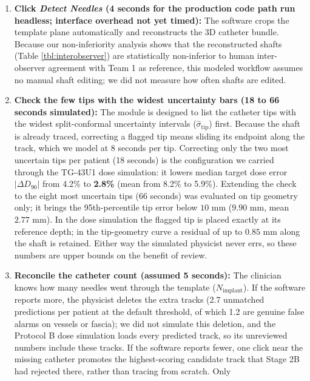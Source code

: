 \documentclass[
  11pt,
]{article}
\providecommand{\tightlist}{%
  \setlength{\itemsep}{0pt}\setlength{\parskip}{0pt}}
\begin{document}
\begin{enumerate}
\def\labelenumi{\arabic{enumi}.}
\tightlist
\item
  \textbf{Click \emph{Detect Needles} (4 seconds for the production code
  path run headless; interface overhead not yet timed):} The software
  crops the template plane automatically and reconstructs the 3D
  catheter bundle. Because our non-inferiority analysis shows that the
  reconstructed shafts (Table \ref{tbl:interobserver}) are statistically
  non-inferior to human inter-observer agreement with Team 1 as
  reference, this modeled workflow assumes no manual shaft editing; we
  did not measure how often shafts are edited.
\item
  \textbf{Check the few tips with the widest uncertainty bars (18 to 66
  seconds simulated):} The module is designed to list the catheter tips
  with the widest split-conformal uncertainty intervals
  (\(\hat{\sigma}_{\text{tip}}\)) first. Because the shaft is already
  traced, correcting a flagged tip means sliding its endpoint along the
  track, which we model at 8 seconds per tip. Correcting only the two
  most uncertain tips per patient (18 seconds) is the configuration we
  carried through the TG-43U1 dose simulation: it lowers median target
  dose error \(|\Delta D_{90}|\) from 4.2\% to \textbf{2.8\%} (mean from
  8.2\% to 5.9\%). Extending the check to the eight most uncertain tips
  (66 seconds) was evaluated on tip geometry only; it brings the
  95th-percentile tip error below \(10\text{ mm}\) (\(9.90\text{ mm}\),
  mean \(2.77\text{ mm}\)). In the dose simulation the flagged tip is
  placed exactly at its reference depth; in the tip-geometry curve a
  residual of up to \(0.85\text{ mm}\) along the shaft is retained.
  Either way the simulated physicist never errs, so these numbers are
  upper bounds on the benefit of review.
\item
  \textbf{Reconcile the catheter count (assumed 5 seconds):} The
  clinician knows how many needles went through the template
  (\(N_{\text{implant}}\)). If the software reports more, the physicist
  deletes the extra tracks (2.7 unmatched predictions per patient at the
  default threshold, of which 1.2 are genuine false alarms on vessels or
  fascia); we did not simulate this deletion, and the Protocol B dose
  simulation loads every predicted track, so its unreviewed numbers
  include these tracks. If the software reports fewer, one click near
  the missing catheter promotes the highest-scoring candidate track that
  Stage 2B had rejected there, rather than tracing from scratch. Only

\end{enumerate}
\end{document}
